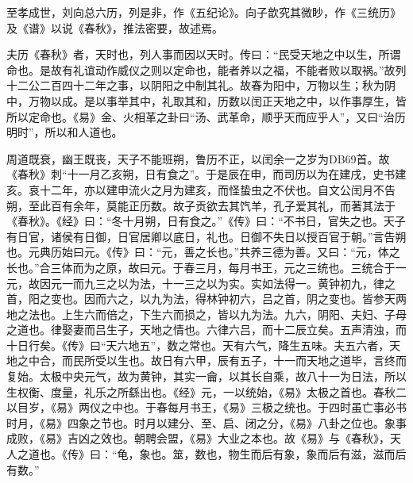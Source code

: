 \documentclass[]{article}
\begin{document}
至孝成世，刘向总六历，列是非，作《五纪论》。向子歆究其微眇，作《三统历》及《谱》以说《春秋》，推法密要，故述焉。

夫历《春秋》者，天时也，列人事而因以天时。传曰：``民受天地之中以生，所谓命也。是故有礼谊动作威仪之则以定命也，能者养以之福，不能者败以取祸。''故列十二公二百四十二年之事，以阴阳之中制其礼。故春为阳中，万物以生；秋为阴中，万物以成。是以事举其中，礼取其和，历数以闰正天地之中，以作事厚生，皆所以定命也。《易》金、火相革之卦曰``汤、武革命，顺乎天而应乎人''，又曰``治历明时''，所以和人道也。

周道既衰，幽王既丧，天子不能班朔，鲁历不正，以闰余一之岁为DB69首。故《春秋》刺``十一月乙亥朔，日有食之''。于是辰在申，而司历以为在建戌，史书建亥。哀十二年，亦以建申流火之月为建亥，而怪蛰虫之不伏也。自文公闰月不告朔，至此百有余年，莫能正历数。故子贡欲去其饩羊，孔子爱其礼，而著其法于《春秋》。《经》曰：``冬十月朔，日有食之。''《传》曰：``不书日，官失之也。天子有日官，诸侯有日御，日官居卿以底日，礼也。日御不失日以授百官于朝。''言告朔也。元典历始曰元。《传》曰：``元，善之长也。''共养三德为善。又曰：``元，体之长也。''合三体而为之原，故曰元。于春三月，每月书王，元之三统也。三统合于一元，故因元一而九三之以为法，十一三之以为实。实如法得一。黄钟初九，律之首，阳之变也。因而六之，以九为法，得林钟初六，吕之首，阴之变也。皆参天两地之法也。上生六而倍之，下生六而损之，皆以九为法。九六，阴阳、夫妇、子母之道也。律娶妻而吕生子，天地之情也。六律六吕，而十二辰立矣。五声清浊，而十日行矣。《传》曰``天六地五''，数之常也。天有六气，降生五味。夫五六者，天地之中合，而民所受以生也。故日有六甲，辰有五子，十一而天地之道毕，言终而复始。太极中央元气，故为黄钟，其实一龠，以其长自乘，故八十一为日法，所以生权衡、度量，礼乐之所繇出也。《经》元，一以统始，《易》太极之首也。春秋二以目岁，《易》两仪之中也。于春每月书王，《易》三极之统也。于四时虽亡事必书时月，《易》四象之节也。时月以建分、至、启、闭之分，《易》八卦之位也。象事成败，《易》吉凶之效也。朝聘会盟，《易》大业之本也。故《易》与《春秋》，天人之道也。《传》曰：``龟，象也。筮，数也，物生而后有象，象而后有滋，滋而后有数。''
\end{document}
